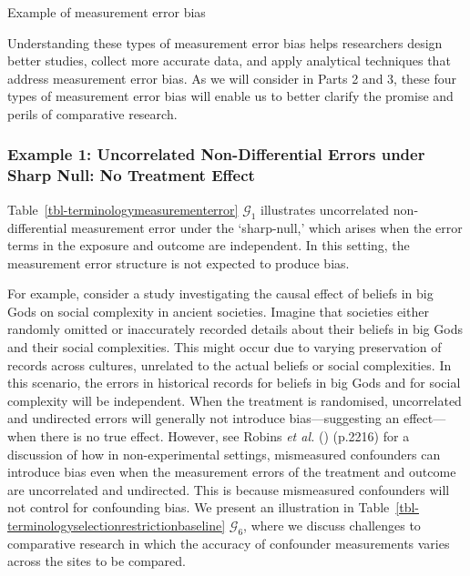 \documentclass[
  single column]{article}
\begin{document}
\begin{table}

\caption{\label{tbl-terminologymeasurementerror}Example of measurement
error bias}

\centering{

\terminologymeasurementerror

}

\end{table}%

Understanding these types of measurement error bias helps researchers
design better studies, collect more accurate data, and apply analytical
techniques that address measurement error bias. As we will consider in
Parts 2 and 3, these four types of measurement error bias will enable us
to better clarify the promise and perils of comparative research.

\subsubsection{Example 1: Uncorrelated Non-Differential Errors under
Sharp Null: No Treatment
Effect}\label{example-1-uncorrelated-non-differential-errors-under-sharp-null-no-treatment-effect}

Table~\ref{tbl-terminologymeasurementerror} \(\mathcal{G}_1\)
illustrates uncorrelated non-differential measurement error under the
`sharp-null,' which arises when the error terms in the exposure and
outcome are independent. In this setting, the measurement error
structure is not expected to produce bias.

For example, consider a study investigating the causal effect of beliefs
in big Gods on social complexity in ancient societies. Imagine that
societies either randomly omitted or inaccurately recorded details about
their beliefs in big Gods and their social complexities. This might
occur due to varying preservation of records across cultures, unrelated
to the actual beliefs or social complexities. In this scenario, the
errors in historical records for beliefs in big Gods and for social
complexity will be independent. When the treatment is randomised,
uncorrelated and undirected errors will generally not introduce
bias---suggesting an effect---when there is no true effect. However, see
Robins \emph{et al.} () (p.2216)
for a discussion of how in non-experimental settings, mismeasured
confounders can introduce bias even when the measurement errors of the
treatment and outcome are uncorrelated and undirected. This is because
mismeasured confounders will not control for confounding bias. We
present an illustration in
Table~\ref{tbl-terminologyselectionrestrictionbaseline}
\(\mathcal{G}_6\), where we discuss challenges to comparative research
in which the accuracy of confounder measurements varies across the sites
to be compared.
\end{document}
